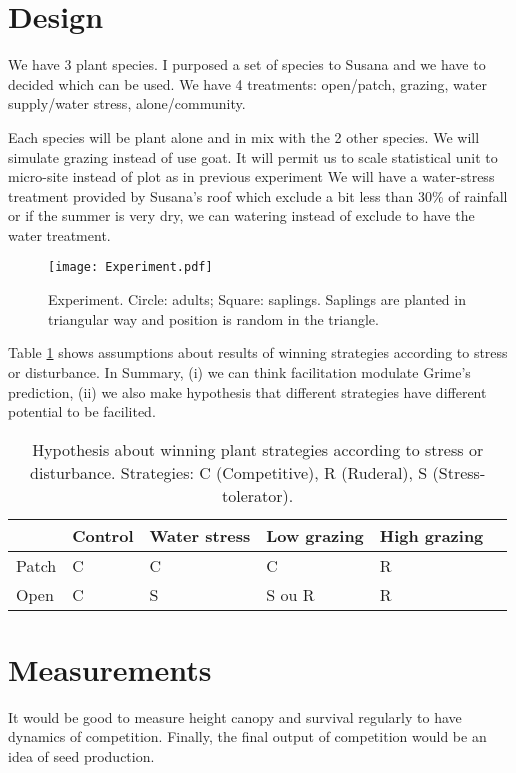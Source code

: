 \documentclass[12pt]{article} %
\begin{document}
\section{Design}

We have 3 plant species. I purposed a set of species to Susana and we have to decided which can be used. We have 4 treatments: open/patch, grazing, water supply/water stress, alone/community.

Each species will be plant alone and in mix with the 2 other species. We will simulate grazing instead of use goat. It will permit us to scale statistical unit to micro-site instead of plot as in previous experiment 
We will have a water-stress treatment provided by Susana's roof which exclude a bit less than 30\% of rainfall or if the summer is very dry, we can watering instead of exclude to have the water treatment.

\begin{figure}
\begin{center}
\texttt{[image: Experiment.pdf]}
\end{center}
\caption{Experiment. Circle: adults; Square: saplings. Saplings are planted in triangular way and position is random in the triangle. \label{exp}}
\end{figure}

Table \ref{hyp} shows assumptions about results of winning strategies according to stress or disturbance. In Summary, (i) we can think facilitation modulate Grime's prediction, (ii) we also make hypothesis that different strategies have different potential to be facilited.


\begin{table}
\begin{center}
\begin{tabular}{|l|l|l|l|l|l|}
  \hline
  & Control & Water stress & Low grazing & High grazing  \\
  \hline
  Patch & C & C & C & R \\
  \hline
  Open & C & S & S ou R & R \\
  \hline
\end{tabular} 
\end{center}
\caption{Hypothesis about winning plant strategies according to stress or disturbance.  Strategies: C (Competitive), R (Ruderal), S (Stress-tolerator). \label{hyp}}
\end{table}

\section{Measurements}
It would be good to measure height canopy and survival regularly to have dynamics of competition. Finally, the final output of competition would be an idea of seed production.
\end{document}
